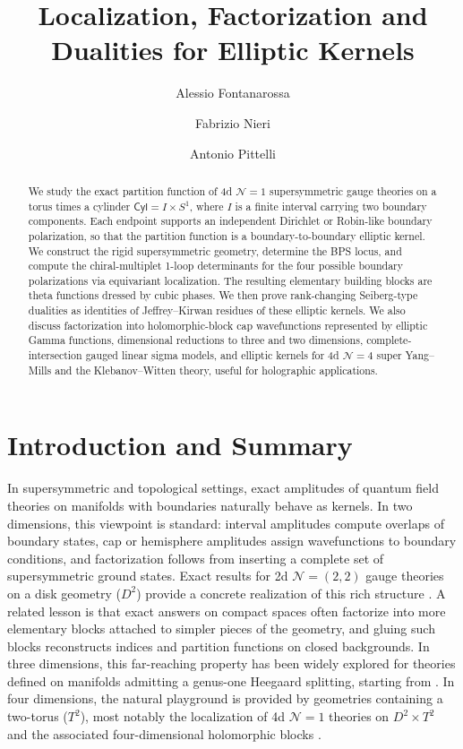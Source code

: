 \documentclass[11pt,a4paper]{article}
\title{Localization, Factorization and  Dualities for Elliptic Kernels}
\author[1,2]{Alessio Fontanarossa}
\author[1,2]{Fabrizio Nieri}
\author[1,2]{Antonio Pittelli}
\affil[1]{\emph{Dipartimento di Matematica, Universit\`a di Torino, Via Carlo Alberto 10, 10123 Torino, Italy}}
\affil[2]{\emph{INFN, Sezione di Torino, Via Pietro Giuria 1, 10125 Torino, Italy}}
\date{}
\numberwithin{equation}{section}
\theoremstyle{plain}
\theoremstyle{definition}
\theoremstyle{remark}
\newcommand{\cyl}{\mathsf{Cyl}}
\begin{document}
\setcounter{secnumdepth}{3}

\maketitle

\begin{abstract}
We study the exact partition function
of 4d \(\mathcal N=1\) supersymmetric gauge theories on a torus times a cylinder \(\cyl=I\times S^1\), where \(I\) is a finite interval carrying two boundary components.  Each endpoint supports
an independent Dirichlet or Robin-like boundary polarization, so that the partition
function is a boundary-to-boundary elliptic kernel.  We construct the rigid supersymmetric
geometry, determine the BPS locus, and compute the chiral-multiplet 1-loop
determinants for the four possible boundary polarizations via equivariant localization.
The resulting elementary building blocks are theta functions dressed by
cubic  phases.  We then prove rank-changing Seiberg-type
dualities as identities of Jeffrey--Kirwan residues of these elliptic kernels.
We also discuss factorization into holomorphic-block cap wavefunctions represented by elliptic Gamma functions,
dimensional reductions to three and two dimensions, complete-intersection gauged
linear sigma models, and elliptic kernels for 4d \(\mathcal N=4\) super Yang--Mills and the
Klebanov--Witten theory, useful for holographic applications. 
\end{abstract}


\setcounter{tocdepth}{3}
\tableofcontents


\section{Introduction and Summary}

In supersymmetric and topological settings, exact amplitudes of quantum field theories on manifolds with boundaries naturally behave as kernels.  In two dimensions, this viewpoint is standard: interval amplitudes compute overlaps of boundary states, cap or hemisphere amplitudes assign wavefunctions to boundary conditions, and factorization follows from inserting a complete set of supersymmetric ground states. Exact results for 2d \( \mathcal N = (2,2) \) gauge theories on a disk geometry ($D^2$) provide a concrete realization of this rich structure \cite{Hori:2013ika,Honda:2013uca}. A related lesson is that exact answers on compact spaces \cite{Pestun:2007rz,Festuccia:2011ws,Dumitrescu:2012ha} often factorize into more elementary blocks attached to simpler pieces of the geometry, and gluing such blocks reconstructs indices and partition functions on closed backgrounds. In three dimensions, this far-reaching property has been widely explored for theories defined on manifolds admitting a genus-one Heegaard splitting, starting from \cite{Pasquetti:2011fj,Beem:2012mb}. In four dimensions, the natural playground is provided by geometries containing a two-torus ($T^2$), most notably the localization of 4d \(\mathcal N=1\) theories on \(D^2\times T^2\) and the associated four-dimensional holomorphic blocks \cite{Longhi:2019hdh,Nieri:2015yia}. 
\end{document}
